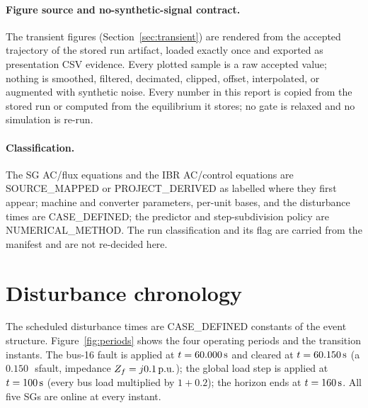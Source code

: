 \documentclass[12pt,a4paper]{article}
\newcommand{\pu}{\ifmmode\,\mathrm{p.u.}\else\ p.u.\fi}
\newcommand{\second}{\ifmmode\,\mathrm{s}\else\ s\fi}
\newcommand{\code}[1]{\texttt{\detokenize{#1}}}
\begin{document}
\paragraph{Figure source and no-synthetic-signal contract.}
The transient figures (Section~\ref{sec:transient}) are rendered from the
accepted trajectory of the stored run artifact, loaded exactly once and exported
as presentation CSV evidence.  Every plotted sample is a raw accepted value;
nothing is smoothed, filtered, decimated, clipped, offset, interpolated, or
augmented with synthetic noise.  Every number in this report is copied from the
stored run or computed from the equilibrium it stores; no gate is relaxed and no
simulation is re-run.

\paragraph{Classification.}
The SG AC/flux equations and the IBR AC/control equations are
\textsf{SOURCE\_MAPPED} or \textsf{PROJECT\_DERIVED} as labelled where they first
appear; machine and converter parameters, per-unit bases, and the disturbance
times are \textsf{CASE\_DEFINED}; the predictor and step-subdivision policy are
\textsf{NUMERICAL\_METHOD}.  The run classification and its
\code{production_certified=false} flag are carried from the manifest and are
not re-decided here.

\section{Disturbance chronology}\label{sec:chrono}
The scheduled disturbance times are \textsf{CASE\_DEFINED} constants of the
event structure.  Figure~\ref{fig:periods} shows the four operating periods and
the transition instants.  The bus-16 fault is applied at $t=60.000\second$ and
cleared at $t=60.150\second$ (a $0.150$\second fault, impedance
$Z_f=j0.1\pu$); the global load step is applied at $t=100\second$ (every bus load
multiplied by $1+0.2$); the horizon ends at $t=160\second$.  All five SGs are
online at every instant.
\end{document}
